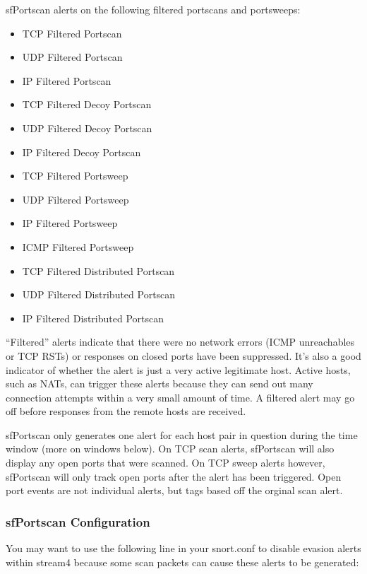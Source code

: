 \documentclass[english]{report}
\begin{document}
sfPortscan alerts on the following filtered portscans and portsweeps:

\begin{itemize}
\item TCP Filtered Portscan
\item UDP Filtered Portscan
\item IP Filtered Portscan

\item TCP Filtered Decoy Portscan
\item UDP Filtered Decoy Portscan
\item IP Filtered Decoy Portscan

\item TCP Filtered Portsweep
\item UDP Filtered Portsweep
\item IP Filtered Portsweep
\item ICMP Filtered Portsweep

\item TCP Filtered Distributed Portscan
\item UDP Filtered Distributed Portscan
\item IP Filtered Distributed Portscan
\end{itemize}

``Filtered'' alerts indicate that there were no network errors (ICMP
unreachables or TCP RSTs) or responses on closed ports have been
suppressed. It's also a good indicator of whether the alert is just a
very active legitimate host. Active hosts, such as NATs, can trigger
these alerts because they can send out many connection attempts within
a very small amount of time. A filtered alert may go off before
responses from the remote hosts are received.

sfPortscan only generates one alert for each host pair in question during
the time window (more on windows below). On TCP scan alerts, sfPortscan
will also display any open ports that were scanned. On TCP sweep alerts
however, sfPortscan will only track open ports after the alert has been
triggered. Open port events are not individual alerts, but tags based
off the orginal scan alert.

\subsubsection{sfPortscan Configuration\label{sfportscan configuration}}

You may want to use the following line in your snort.conf to disable evasion alerts 
within stream4 because some
scan packets can cause these alerts to be generated:
\end{document}
